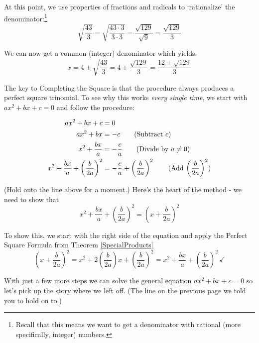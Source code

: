 At this point, we use properties of fractions and radicals to `rationalize' the denominator:\footnote{Recall that this means we want to get a denominator with rational (more specifically, integer) numbers.}  \[ \sqrt{\dfrac{43}{3}} = \sqrt{\dfrac{43 \cdot 3}{3 \cdot 3}} = \dfrac{\sqrt{129}}{\sqrt{9}} = \dfrac{\sqrt{129}}{3} \]

We can now get a common (integer) denominator which yields: \[x=  4 \pm \sqrt{\dfrac{43}{3}} = 4 \pm \dfrac{\sqrt{129}}{3} = \dfrac{12 \pm \sqrt{129}}{3} \]

The key to Completing the Square is that the procedure always produces a perfect square trinomial. To see why this works \textit{every single time}, we start with $ax^2 + bx + c = 0$ and follow the procedure:

\begin{align*}
ax^2 + bx + c & = 0 \\
ax^2 + bx & = -c \tag{Subtract $c$} \\
x^2 + \dfrac{bx}{a} & = -\dfrac{c}{a} \tag{Divide by $a \neq 0$} \\
x^2 + \dfrac{bx}{a} + \left(\dfrac{b}{2a}\right)^2 & = -\dfrac{c}{a} + \left(\dfrac{b}{2a}\right)^2 \tag{Add $ \left(\dfrac{b}{2a}\right)^2$} \\
\end{align*}

(Hold onto the line above for a moment.)  Here's the heart of the method - we need to show that \[ x^2 + \dfrac{bx}{a} + \left(\dfrac{b}{2a}\right)^2 = \left(x + \dfrac{b}{2a}\right)^2 \]

To show this, we start with the right side of the equation and apply the Perfect Square Formula from Theorem \ref{SpecialProducts} \[ \left(x + \dfrac{b}{2a}\right)^2 = x^2 + 2\left(\dfrac{b}{2a}\right)x + \left(\dfrac{b}{2a}\right)^2 = x^2 + \dfrac{bx}{a} + \left(\dfrac{b}{2a}\right)^2 \, \checkmark \]

With just a few more steps we can solve the general equation $ax^{2} + bx + c = 0$ so let's pick up the story where we left off. (The line on the previous page we told you to hold on to.)

